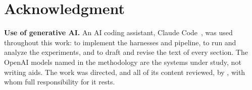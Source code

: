 \section*{Acknowledgment}
\textbf{Use of generative AI.} An AI coding assistant, Claude
Code~\cite{anthropic2026claudecode}, was used throughout this work: to
implement the harnesses and pipeline, to run and analyze the experiments, and
to draft and revise the text of every section. The OpenAI models named in the
methodology are the systems under study, not writing aids. The work was directed, and all of its content reviewed, by
\responsibleauthor{}, with whom full responsibility for it rests.
